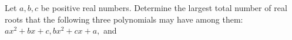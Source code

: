 Let $a,b,c$ be positive real numbers. Determine the largest total number of real roots that the following three polynomials may have among them: $ax^2+bx+c, bx^2+cx+a,$ and 